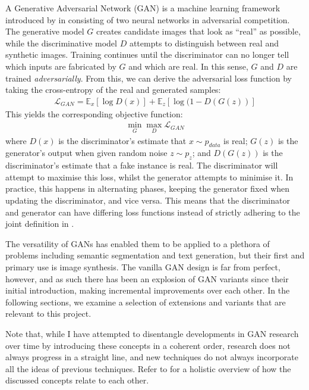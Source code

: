 A Generative Adversarial Network (GAN) is a machine learning framework introduced by \citeauthor{gan} in \citeyear{gan} \cite{gan} consisting of two neural networks in adversarial competition. The generative model $G$ creates candidate images that look as ``real'' as possible, while the discriminative model $D$ attempts to distinguish between real and synthetic images. Training continues until the discriminator can no longer tell which inputs are fabricated by $G$ and which are real. In this sense, $G$ and $D$ are trained \emph{adversarially}. From this, we can derive the adversarial loss function by taking the cross-entropy of the real and generated samples:
\begin{align} \label{eq:ganloss}
    \mathcal{L}_{GAN} = \mathbb{E}_x[\log D(x)] + \mathbb{E}_z[\log (1-D(G(z))]
\end{align}
This yields the corresponding objective function:
\begin{align}
    \min_G \max_D \mathcal{L}_{GAN}
\end{align}
where $D(x)$ is the discriminator's estimate that $x \sim p_{data}$ is real; $G(z)$ is the generator's output when given random noise $z\sim p_z$; and $D(G(z))$ is the discriminator's estimate that a fake instance is real.
The discriminator will attempt to maximise this loss, whilst the generator attempts to minimise it.
In practice, this happens in alternating phases, keeping the generator fixed when updating the discriminator, and vice versa.
This means that the discriminator and generator can have differing loss functions instead of strictly adhering to the joint definition in .

The versatility of GANs has enabled them to be applied to a plethora of problems including semantic segmentation and text generation, but their first and primary use is image synthesis.
The vanilla GAN design is far from perfect, however, and as such there has been an explosion of GAN variants since their initial introduction, making incremental improvements over each other.
In the following sections, we examine a selection of extensions and variants that are relevant to this project. 

Note that, while I have attempted to disentangle developments in GAN research over time by introducing these concepts in a coherent order, research does not always progress in a straight line, and new techniques do not always incorporate all the ideas of previous techniques.
Refer to  for a holistic overview of how the discussed concepts relate to each other.

